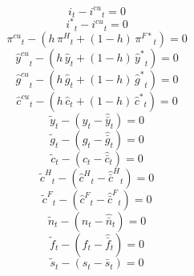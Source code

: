 \begin{dmath}
{{i}}_{t}-{{i^{cu}}}_{t}=0
\end{dmath}
\begin{dmath}
{{i^*}}_{t}-{{i^{cu}}}_{t}=0
\end{dmath}
\begin{dmath}
{{\pi^{cu}}}_{t}-\left({{h}}\, {{\pi^H}}_{t}+\left(1-{{h}}\right)\, {{\pi^{F*}}}_{t}\right)=0
\end{dmath}
\begin{dmath}
{{\hat y^{cu}}}_{t}-\left({{h}}\, {{\hat y}}_{t}+\left(1-{{h}}\right)\, {{\hat y^*}}_{t}\right)=0
\end{dmath}
\begin{dmath}
{{\hat g^{cu}}}_{t}-\left({{h}}\, {{\hat g}}_{t}+\left(1-{{h}}\right)\, {{\hat g^*}}_{t}\right)=0
\end{dmath}
\begin{dmath}
{{\hat c^{cu}}}_{t}-\left({{h}}\, {{\hat c}}_{t}+\left(1-{{h}}\right)\, {{\hat c^*}}_{t}\right)=0
\end{dmath}
\begin{dmath}
{{\tilde y}}_{t}-\left({{\hat y}}_{t}-{{\hat {\bar y}}}_{t}\right)=0
\end{dmath}
\begin{dmath}
{{\tilde g}}_{t}-\left({{\hat g}}_{t}-{{\hat {\bar g}}}_{t}\right)=0
\end{dmath}
\begin{dmath}
{{\tilde c}}_{t}-\left({{\hat c}}_{t}-{{\hat {\bar c}}}_{t}\right)=0
\end{dmath}
\begin{dmath}
{{\tilde c^H}}_{t}-\left({{\hat c^H}}_{t}-{{\hat {\bar c}^H}}_{t}\right)=0
\end{dmath}
\begin{dmath}
{{\tilde c^F}}_{t}-\left({{\hat c^F}}_{t}-{{\hat {\bar c}^F}}_{t}\right)=0
\end{dmath}
\begin{dmath}
{{\tilde n}}_{t}-\left({{\hat n}}_{t}-{{\hat {\bar n}}}_{t}\right)=0
\end{dmath}
\begin{dmath}
{{\tilde f}}_{t}-\left({{\hat f}}_{t}-{{\hat {\bar f}}}_{t}\right)=0
\end{dmath}
\begin{dmath}
{{\tilde s}}_{t}-\left({{s}}_{t}-{{\bar s}}_{t}\right)=0
\end{dmath}
